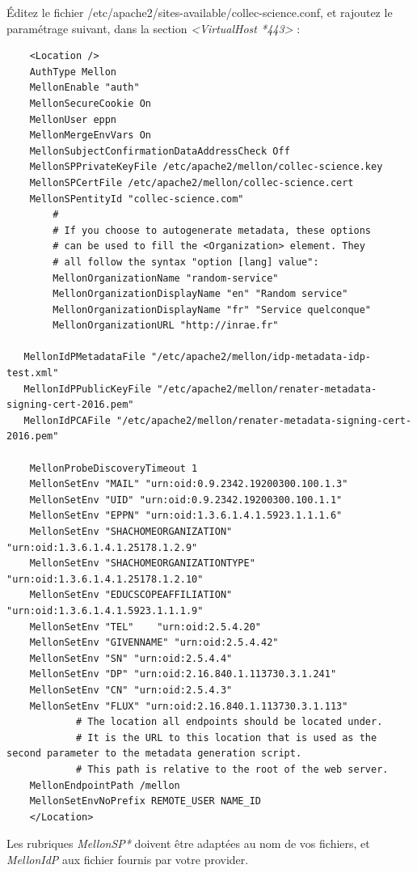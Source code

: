 Éditez le fichier /etc/apache2/sites-available/collec-science.conf, et rajoutez le paramétrage suivant, dans la section \textit{<VirtualHost *443>} :
\begin{lstlisting}
    <Location />
    AuthType Mellon
    MellonEnable "auth"
    MellonSecureCookie On
    MellonUser eppn
    MellonMergeEnvVars On
    MellonSubjectConfirmationDataAddressCheck Off
    MellonSPPrivateKeyFile /etc/apache2/mellon/collec-science.key
    MellonSPCertFile /etc/apache2/mellon/collec-science.cert
    MellonSPentityId "collec-science.com"
        #
        # If you choose to autogenerate metadata, these options
        # can be used to fill the <Organization> element. They
        # all follow the syntax "option [lang] value":
        MellonOrganizationName "random-service"
        MellonOrganizationDisplayName "en" "Random service"
        MellonOrganizationDisplayName "fr" "Service quelconque"
        MellonOrganizationURL "http://inrae.fr"

   MellonIdPMetadataFile "/etc/apache2/mellon/idp-metadata-idp-test.xml"
   MellonIdPPublicKeyFile "/etc/apache2/mellon/renater-metadata-signing-cert-2016.pem"
   MellonIdPCAFile "/etc/apache2/mellon/renater-metadata-signing-cert-2016.pem"

    MellonProbeDiscoveryTimeout 1
    MellonSetEnv "MAIL" "urn:oid:0.9.2342.19200300.100.1.3"
    MellonSetEnv "UID" "urn:oid:0.9.2342.19200300.100.1.1"
    MellonSetEnv "EPPN" "urn:oid:1.3.6.1.4.1.5923.1.1.1.6"
    MellonSetEnv "SHACHOMEORGANIZATION" "urn:oid:1.3.6.1.4.1.25178.1.2.9"
    MellonSetEnv "SHACHOMEORGANIZATIONTYPE" "urn:oid:1.3.6.1.4.1.25178.1.2.10"
    MellonSetEnv "EDUCSCOPEAFFILIATION" "urn:oid:1.3.6.1.4.1.5923.1.1.1.9"
    MellonSetEnv "TEL"    "urn:oid:2.5.4.20"
    MellonSetEnv "GIVENNAME" "urn:oid:2.5.4.42"
    MellonSetEnv "SN" "urn:oid:2.5.4.4"
    MellonSetEnv "DP" "urn:oid:2.16.840.1.113730.3.1.241"
    MellonSetEnv "CN" "urn:oid:2.5.4.3"
    MellonSetEnv "FLUX" "urn:oid:2.16.840.1.113730.3.1.113"
            # The location all endpoints should be located under.
            # It is the URL to this location that is used as the second parameter to the metadata generation script.
            # This path is relative to the root of the web server.
    MellonEndpointPath /mellon
    MellonSetEnvNoPrefix REMOTE_USER NAME_ID
    </Location>
\end{lstlisting}

Les rubriques \textit{MellonSP*} doivent être adaptées au nom de vos fichiers, et \textit{MellonIdP} aux fichier fournis par votre provider.

